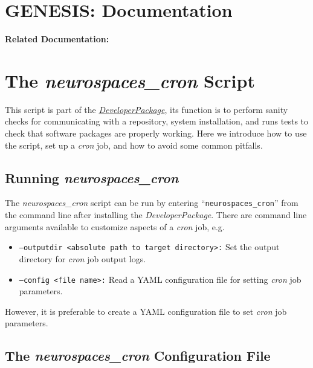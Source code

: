 \documentclass[12pt]{article}
\begin{document}
\section*{GENESIS: Documentation}

{\bf Related Documentation:}

\section*{The {\it neurospaces\_cron} Script}

This script is part of the \href{../developer-package}{\it DeveloperPackage}, its function is to perform sanity checks for communicating with a repository, system installation, and runs tests to check that software packages are properly working. Here we introduce how to use the script, set up a {\it cron} job, and how to avoid some common pitfalls.

\subsection*{Running {\it neurospaces\_cron}}

The {\it neurospaces\_cron} script can be run by entering ``{\tt neurospaces\_cron}'' from the command line after installing the {\it DeveloperPackage}. There are command line arguments available to customize aspects of a {\it cron} job, e.g.
\begin{itemize}
   \item {\tt --outputdir <absolute path to target directory>:} Set the output directory for {\it cron} job output logs.
   \item {\tt --config <file name>:} Read a YAML configuration file for setting {\it cron} job parameters.
\end{itemize}
However, it is preferable to create a YAML configuration file to set {\it cron} job parameters.

\subsection*{The  {\it neurospaces\_cron} Configuration File}
\end{document}
